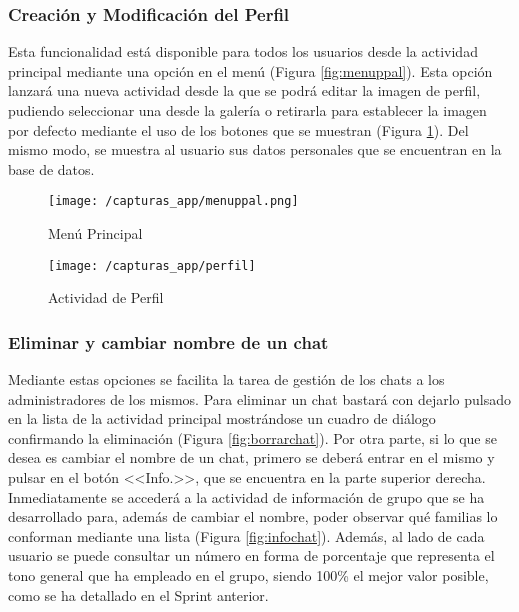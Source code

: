 \clearpage

\subsubsection{Creación y Modificación del Perfil}
Esta funcionalidad está disponible para todos los usuarios desde la actividad principal mediante una opción en el menú (Figura \ref{fig:menuppal}). Esta opción lanzará una nueva actividad desde la que se podrá editar la imagen de perfil, pudiendo seleccionar una desde la galería o retirarla para establecer la imagen por defecto mediante el uso de los botones que se muestran (Figura \ref{fig:perfil}). Del mismo modo, se muestra al usuario sus datos personales que se encuentran en la base de datos.

\begin{figure}[!h]
	\centering
	\begin{minipage}{.5\textwidth}
		\centering
		\texttt{[image: /capturas\_app/menuppal.png]}
		\caption{Menú Principal}
		\label{fig:menuppal}
	\end{minipage}%
	\begin{minipage}{.5\textwidth}
		\centering
		\texttt{[image: /capturas\_app/perfil]}
		\caption{Actividad de Perfil}
		\label{fig:perfil}
	\end{minipage}
\end{figure}

\clearpage

\subsubsection{Eliminar y cambiar nombre de un chat}
Mediante estas opciones se facilita la tarea de gestión de los chats a los administradores de los mismos. Para eliminar un chat bastará con dejarlo pulsado en la lista de la actividad principal mostrándose un cuadro de diálogo confirmando la eliminación (Figura \ref{fig:borrarchat}). Por otra parte, si lo que se desea es cambiar el nombre de un chat, primero se deberá entrar en el mismo y pulsar en el botón <<Info.>>, que se encuentra en la parte superior derecha. Inmediatamente se accederá a la actividad de información de grupo que se ha desarrollado para, además de cambiar el nombre, poder observar qué familias lo conforman mediante una lista (Figura \ref{fig:infochat}). Además, al lado de cada usuario se puede consultar un número en forma de porcentaje que representa el tono general que ha empleado en el grupo, siendo 100\% el mejor valor posible, como se ha detallado en el Sprint anterior.

